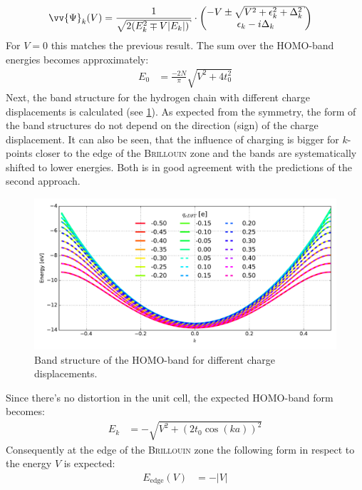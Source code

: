 \begin{align}
\vv{\Psi}_k(V) &= \frac{1}{\sqrt{2\left(E_k^2\mp V|E_k|\right)}}\cdot \begin{pmatrix*}[c]
-V\pm \sqrt{V^2+\epsilon_k^2+\Delta_k^2}\\
\epsilon_k - i \Delta_k
\end{pmatrix*}
\end{align}
For $V=0$ this matches the previous result. The sum over the HOMO-band energies becomes approximately:
\begin{align}
	E_0 &= \frac{-2N}{\pi} \sqrt{V^2+4t_0^2}
	\label{equation_ext_pot}
\end{align} 
Next, the band structure for the hydrogen chain with different charge displacements is calculated (see \cref{image_hydrogen_charged_bands}). As expected from the symmetry, the form of the band structures do not depend on the direction (sign) of the charge displacement. It can also be seen, that the influence of charging is bigger for $k$-points closer to the edge of the \textsc{Brillouin} zone and the bands are systematically shifted to lower energies. Both is in good agreement with the predictions of the second approach.
\begin{figure}
	\centering
	\includegraphics[width = 13cm]{Images/Hydrogen/charging/band_structure_q_1}
	\caption{Band structure of the HOMO-band for different charge displacements.}
	\label{image_hydrogen_charged_bands}
\end{figure}
Since there's no distortion in the unit cell, the expected HOMO-band form becomes:
\begin{align}
E_k &= -\sqrt{V^2 + \left(2t_0\cos(ka)\right)^2}
\end{align}
Consequently at the edge of the \textsc{Brillouin} zone the following form in respect to the energy $V$ is expected:
\begin{align}
E_\text{edge}(V) &= -\left|V\right|
\end{align}
